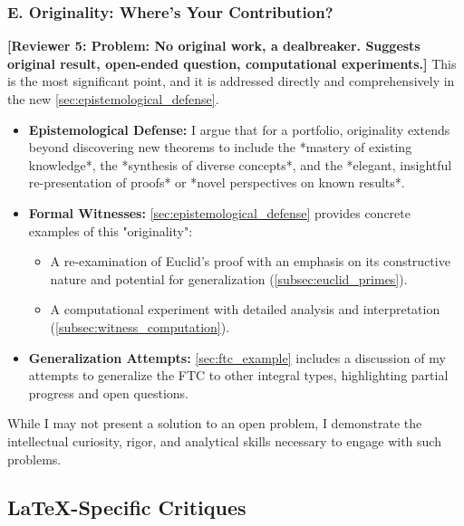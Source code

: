 \documentclass[11pt, a4paper]{article}
\theoremstyle{plain} %
\theoremstyle{definition} %
\theoremstyle{remark} %
\newcommand{\reviewer}[1]{\textcolor{reviewercolor}{\textbf{[Reviewer 5: #1]}}}
\begin{document}
\subsubsection*{E. Originality: Where's Your Contribution?}
\reviewer{Problem: No original work, a dealbreaker. Suggests original result, open-ended question, computational experiments.}
This is the most significant point, and it is addressed directly and comprehensively in the new \ref{sec:epistemological_defense}.
\begin{itemize}
    \item \textbf{Epistemological Defense:} I argue that for a portfolio, originality extends beyond discovering new theorems to include the *mastery of existing knowledge*, the *synthesis of diverse concepts*, and the *elegant, insightful re-presentation of proofs* or *novel perspectives on known results*.
    \item \textbf{Formal Witnesses:} \ref{sec:epistemological_defense} provides concrete examples of this "originality":
    \begin{itemize}
        \item A re-examination of Euclid's proof with an emphasis on its constructive nature and potential for generalization (\ref{subsec:euclid_primes}).
        \item A computational experiment with detailed analysis and interpretation (\ref{subsec:witness_computation}).
    \end{itemize}
    \item \textbf{Generalization Attempts:} \ref{sec:ftc_example} includes a discussion of my attempts to generalize the FTC to other integral types, highlighting partial progress and open questions.
\end{itemize}
While I may not present a solution to an open problem, I demonstrate the intellectual curiosity, rigor, and analytical skills necessary to engage with such problems.

\subsection{LaTeX-Specific Critiques}
\end{document}
